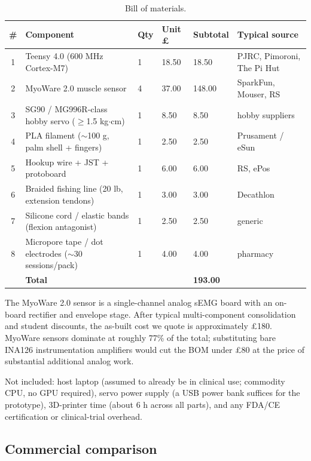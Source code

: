 \documentclass{article}
\begin{document}
\begin{table}[h]
  \caption{Bill of materials.}
  \label{tab:bom}
  \centering
  \small
  \begin{tabular}{clllll}
    \toprule
    \# & Component & Qty & Unit \pounds & Subtotal & Typical source \\
    \midrule
    1 & Teensy 4.0 (600 MHz Cortex-M7) & 1 & 18.50 & 18.50 & PJRC, Pimoroni, The Pi Hut \\
    2 & MyoWare 2.0 muscle sensor & 4 & 37.00 & 148.00 & SparkFun, Mouser, RS \\
    3 & SG90 / MG996R-class hobby servo ($\geq$1.5 kg$\cdot$cm) & 1 & 8.50 & 8.50 & hobby suppliers \\
    4 & PLA filament ($\sim$100 g, palm shell + fingers) & 1 & 2.50 & 2.50 & Prusament / eSun \\
    5 & Hookup wire + JST + protoboard & 1 & 6.00 & 6.00 & RS, ePos \\
    6 & Braided fishing line (20 lb, extension tendons) & 1 & 3.00 & 3.00 & Decathlon \\
    7 & Silicone cord / elastic bands (flexion antagonist) & 1 & 2.50 & 2.50 & generic \\
    8 & Micropore tape / dot electrodes ($\sim$30 sessions/pack) & 1 & 4.00 & 4.00 & pharmacy \\
    \midrule
    & \textbf{Total} & & & \textbf{193.00} & \\
    \bottomrule
  \end{tabular}
\end{table}

The MyoWare 2.0 sensor is a single-channel analog sEMG board with an on-board rectifier and envelope stage. After typical multi-component consolidation and student discounts, the as-built cost we quote is approximately \pounds 180. MyoWare sensors dominate at roughly 77\% of the total; substituting bare INA126 instrumentation amplifiers would cut the BOM under \pounds 80 at the price of substantial additional analog work.

Not included: host laptop (assumed to already be in clinical use; commodity CPU, no GPU required), servo power supply (a USB power bank suffices for the prototype), 3D-printer time (about 6 h across all parts), and any FDA/CE certification or clinical-trial overhead.

\subsection{Commercial comparison}
\end{document}
